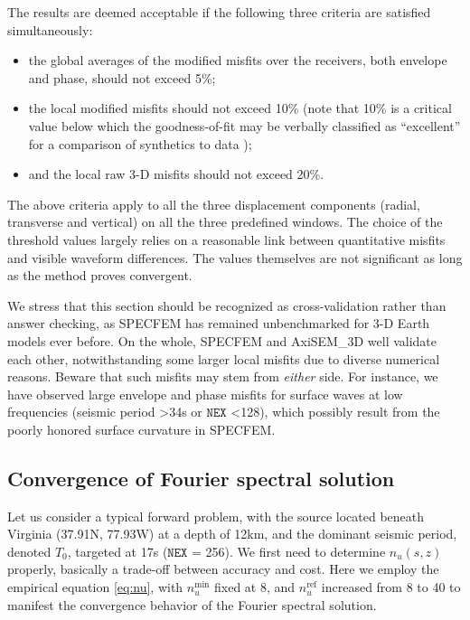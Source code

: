 \documentclass[extra,referee]{gji}
\begin{document}
The results are deemed acceptable if the following three criteria are 
satisfied simultaneously: 
\begin{itemize}
  \item the global averages of the modified misfits over the receivers, 
  both envelope and phase, should not exceed 5\%;
  \item the local modified misfits should not exceed 10\% 
  (note that 10\% is a critical value below which the goodness-of-fit may be 
  verbally classified as ``excellent'' for a comparison of synthetics to data
  \cite[]{kristekova2009time, anderson2004quantitative});
  \item and the local raw 3-D misfits should not exceed 20\%.  
\end{itemize}
The above criteria apply to all the three displacement components 
(radial, transverse and vertical) on all the three predefined windows.
The choice of the threshold values largely relies on a reasonable  
link between quantitative misfits and visible waveform differences. 
The values themselves are not significant as long as the method proves convergent. 

We stress that this section should be recognized as cross-validation 
rather than answer checking, as SPECFEM has remained unbenchmarked 
for 3-D Earth models ever before. 
On the whole, SPECFEM and AxiSEM\_3D well validate each other, 
notwithstanding some larger local misfits due to diverse numerical reasons. 
Beware that such misfits may stem from \textit{either} side.
For instance, we have observed large envelope and phase misfits
for surface waves at low frequencies 
(seismic period \textgreater 34s or $\mathtt{NEX}$ \textless 128), 
which possibly result from the poorly honored surface curvature in SPECFEM.

\subsection{Convergence of Fourier spectral solution}
\label{sec:benconv}
Let us consider a typical forward problem, with the source located
beneath Virginia (37.91\degr N, 77.93\degr W) at a depth of 12km, and the 
dominant seismic period, denoted $T_0$, targeted at 17s ($\mathtt{NEX}$ = 256).  
We first need to determine 
$n_u\left(s,z\right)$ properly, basically a trade-off between accuracy and cost.  
Here we employ the empirical equation \eqref{eq:nu},
with $n_u^\text{min}$ fixed at 8, and $n_u^\text{ref}$ increased 
from 8 to 40 to manifest the convergence behavior of the 
Fourier spectral solution.
\end{document}
